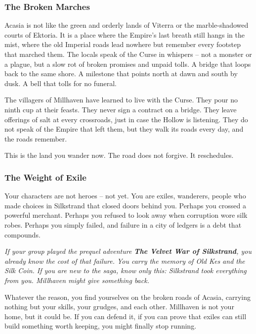 \documentclass[11pt]{article}
\begin{document}
\subsubsection{The Broken Marches}

Acasia is not like the green and orderly lands of Viterra or the marble-shadowed courts of Ektoria. It is a place where the Empire's last breath still hangs in the mist, where the old Imperial roads lead nowhere but remember every footstep that marched them. The locals speak of the Curse in whispers -- not a monster or a plague, but a slow rot of broken promises and unpaid tolls. A bridge that loops back to the same shore. A milestone that points north at dawn and south by dusk. A bell that tolls for no funeral.

The villagers of Millhaven have learned to live with the Curse. They pour no ninth cup at their feasts. They never sign a contract on a bridge. They leave offerings of salt at every crossroads, just in case the Hollow is listening. They do not speak of the Empire that left them, but they walk its roads every day, and the roads remember.

This is the land you wander now. The road does not forgive. It reschedules.

\subsubsection{The Weight of Exile}

Your characters are not heroes -- not yet. You are exiles, wanderers, people who made choices in Silkstrand that closed doors behind you. Perhaps you crossed a powerful merchant. Perhaps you refused to look away when corruption wore silk robes. Perhaps you simply failed, and failure in a city of ledgers is a debt that compounds.

\noindent \textit{If your group played the prequel adventure \textbf{The Velvet War of Silkstrand}, you already know the cost of that failure. You carry the memory of Old Kes and the Silk Coin. If you are new to the saga, know only this: Silkstrand took everything from you. Millhaven might give something back.}

Whatever the reason, you find yourselves on the broken roads of Acasia, carrying nothing but your skills, your grudges, and each other. Millhaven is not your home, but it could be. If you can defend it, if you can prove that exiles can still build something worth keeping, you might finally stop running.
\end{document}
